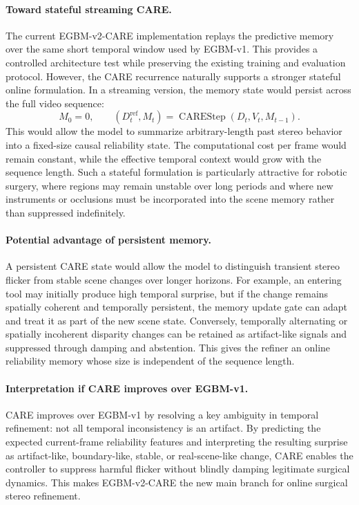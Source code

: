 \documentclass[11pt,a4paper]{article}
\begin{document}
\paragraph{Toward stateful streaming CARE.}
The current EGBM-v2-CARE implementation replays the predictive memory over the
same short temporal window used by EGBM-v1. This provides a controlled
architecture test while preserving the existing training and evaluation
protocol. However, the CARE recurrence naturally supports a stronger stateful
online formulation. In a streaming version, the memory state would persist across
the full video sequence:
\begin{equation}
    M_0 = 0, \qquad
    (D_t^{\mathrm{ref}}, M_t) =
    \operatorname{CAREStep}(D_t, V_t, M_{t-1}).
\end{equation}
This would allow the model to summarize arbitrary-length past stereo behavior
into a fixed-size causal reliability state. The computational cost per frame
would remain constant, while the effective temporal context would grow with the
sequence length. Such a stateful formulation is particularly attractive for
robotic surgery, where regions may remain unstable over long periods and where
new instruments or occlusions must be incorporated into the scene memory rather
than suppressed indefinitely.

\paragraph{Potential advantage of persistent memory.}
A persistent CARE state would allow the model to distinguish transient stereo
flicker from stable scene changes over longer horizons. For example, an entering
tool may initially produce high temporal surprise, but if the change remains
spatially coherent and temporally persistent, the memory update gate can adapt
and treat it as part of the new scene state. Conversely, temporally alternating
or spatially incoherent disparity changes can be retained as artifact-like
signals and suppressed through damping and abstention. This gives the refiner an
online reliability memory whose size is independent of the sequence length.

\paragraph{Interpretation if CARE improves over EGBM-v1.}
CARE improves over EGBM-v1 by resolving a key ambiguity in temporal refinement:
not all temporal inconsistency is an artifact. By predicting the expected
current-frame reliability features and interpreting the resulting surprise as
artifact-like, boundary-like, stable, or real-scene-like change, CARE enables the
controller to suppress harmful flicker without blindly damping legitimate
surgical dynamics. This makes EGBM-v2-CARE the new main branch for online
surgical stereo refinement.
\end{document}
